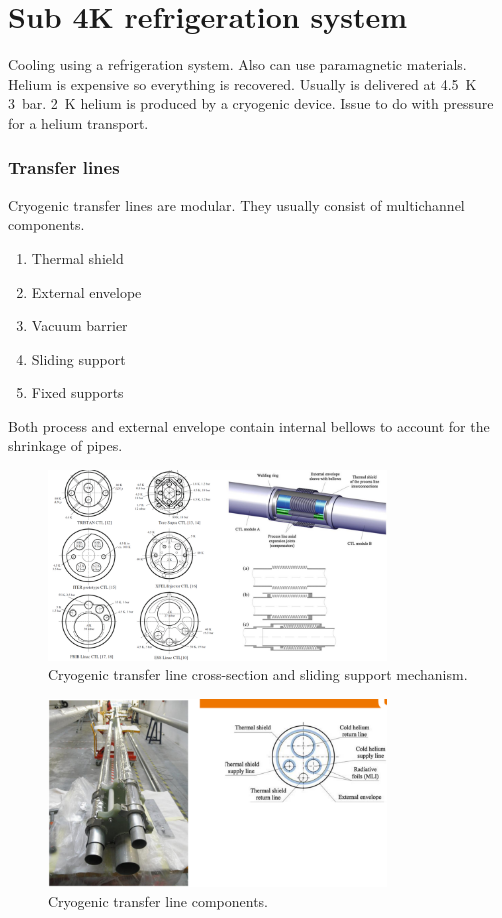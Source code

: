 \section{Sub 4K refrigeration system}
Cooling using a refrigeration system. Also can use paramagnetic materials. Helium is expensive so everything is recovered. Usually  is delivered at \SI{4.5}{\kelvin} \SI{3}{bar}. \SI{2}{\kelvin} helium is produced by a cryogenic device. Issue to do with pressure for a helium transport. 
\subsubsection{Transfer lines}
Cryogenic transfer lines are modular. They usually consist of multichannel components.
\begin{enumerate}
    \item Thermal shield
    \item External envelope
    \item Vacuum barrier
    \item Sliding support
    \item Fixed supports
\end{enumerate}
Both process and external envelope contain internal bellows to account for the shrinkage of pipes.
\begin{figure}[H]
    \centering
    \includegraphics[width = 0.8\textwidth]{img/figure67.png}
    \caption{Cryogenic transfer line cross-section and sliding support mechanism.}
\end{figure}
\begin{figure}[H]
    \centering
    \includegraphics[width = 0.8\textwidth]{img/figure68.png}
    \caption{Cryogenic transfer line components.}
\end{figure}
